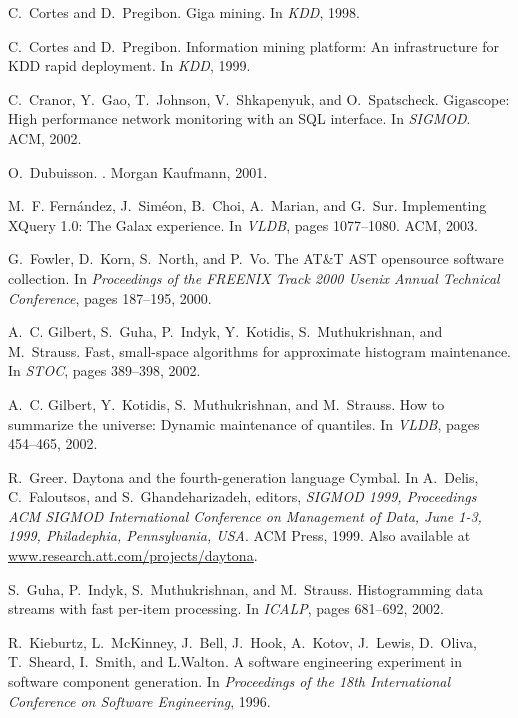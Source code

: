 \documentclass{sigplanconf}
\begin{document}
\begin{thebibliography}{10}
C.~Cortes and D.~Pregibon.
\newblock Giga mining.
\newblock In {\em KDD}, 1998.

C.~Cortes and D.~Pregibon.
\newblock Information mining platform: An infrastructure for {KDD} rapid
  deployment.
\newblock In {\em KDD}, 1999.

C.~Cranor, Y.~Gao, T.~Johnson, V.~Shkapenyuk, and O.~Spatscheck.
\newblock Gigascope: {H}igh performance network monitoring with an {SQL}
  interface.
\newblock In {\em SIGMOD}. ACM, 2002.

O.~Dubuisson.
.
\newblock Morgan Kaufmann, 2001.

M.~F. Fern\'andez, J.~Sim\'eon, B.~Choi, A.~Marian, and G.~Sur.
\newblock Implementing {XQ}uery 1.0: {T}he {G}alax experience.
\newblock In {\em VLDB}, pages 1077--1080. ACM, 2003.

G.~Fowler, D.~Korn, S.~North, and P.~Vo.
\newblock The {AT\&T} {AST} opensource software collection.
\newblock In {\em Proceedings of the {FREENIX} Track 2000 {U}senix Annual
  Technical Conference}, pages 187--195, 2000.

A.~C. Gilbert, S.~Guha, P.~Indyk, Y.~Kotidis, S.~Muthukrishnan, and M.~Strauss.
\newblock Fast, small-space algorithms for approximate histogram maintenance.
\newblock In {\em STOC}, pages 389--398, 2002.

A.~C. Gilbert, Y.~Kotidis, S.~Muthukrishnan, and M.~Strauss.
\newblock How to summarize the universe: Dynamic maintenance of quantiles.
\newblock In {\em VLDB}, pages 454--465, 2002.

R.~Greer.
\newblock Daytona and the fourth-generation language {C}ymbal.
\newblock In A.~Delis, C.~Faloutsos, and S.~Ghandeharizadeh, editors, {\em
  SIGMOD 1999, Proceedings ACM SIGMOD International Conference on Management of
  Data, June 1-3, 1999, Philadephia, Pennsylvania, USA}. ACM Press, 1999.
\newblock Also available at \url{www.research.att.com/projects/daytona}.

S.~Guha, P.~Indyk, S.~Muthukrishnan, and M.~Strauss.
\newblock Histogramming data streams with fast per-item processing.
\newblock In {\em ICALP}, pages 681--692, 2002.

R.~Kieburtz, L.~McKinney, J.~Bell, J.~Hook, A.~Kotov, J.~Lewis, D.~Oliva,
  T.~Sheard, I.~Smith, and L.Walton.
\newblock A software engineering experiment in software component generation.
\newblock In {\em Proceedings of the 18th International Conference on Software
  Engineering}, 1996.


\end{thebibliography}
\end{document}
